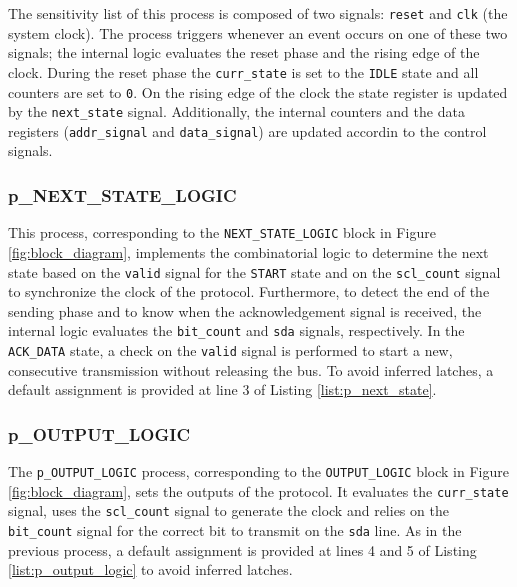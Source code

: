 

The sensitivity list of this process is composed of two signals: \texttt{reset} and \texttt{clk} (the system clock). The process triggers whenever an event occurs on one of these two signals; the internal logic evaluates the reset phase and the rising edge of the clock. During the reset phase the \texttt{curr\_state} is set to the \texttt{IDLE} state and all counters are set to \texttt{0}. On the rising edge of the clock the state register is updated by the \texttt{next\_state} signal. Additionally, the internal counters and the data registers (\texttt{addr\_signal} and \texttt{data\_signal}) are updated accordin to the control signals.

\subsubsection{p\_NEXT\_STATE\_LOGIC}

\begin{minipage}{\textwidth}

\end{minipage}

This process, corresponding to the \texttt{NEXT\_STATE\_LOGIC} block in Figure \ref{fig:block_diagram}, implements the combinatorial logic to determine the next state based on the \texttt{valid} signal for the \texttt{START} state and on the \texttt{scl\_count} signal to synchronize the clock of the \IIC{} protocol. Furthermore, to detect the end of the sending phase and to know when the acknowledgement signal is received, the internal logic evaluates the \texttt{bit\_count} and \texttt{sda} signals, respectively. In the \texttt{ACK\_DATA} state, a check on the \texttt{valid} signal is performed to start a new, consecutive transmission without releasing the \IIC{} bus. To avoid inferred latches, a default assignment is provided at line 3 of Listing \ref{list:p_next_state}.

\subsubsection{p\_OUTPUT\_LOGIC}



The \texttt{p\_OUTPUT\_LOGIC} process, corresponding to the \texttt{OUTPUT\_LOGIC} block in Figure \ref{fig:block_diagram}, sets the outputs of the \IIC{} protocol. It evaluates the \texttt{curr\_state} signal, uses the \texttt{scl\_count} signal to generate the \IIC{} clock and relies on the \texttt{bit\_count} signal for the correct bit to transmit on the \texttt{sda} line. As in the previous process, a default assignment is provided at lines 4 and 5 of Listing \ref{list:p_output_logic} to avoid inferred latches.